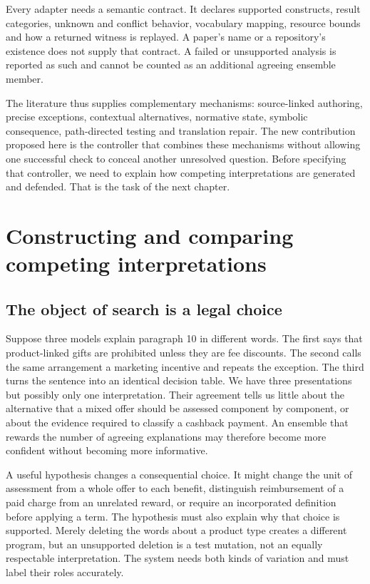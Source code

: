 \documentclass[12pt,a4paper,oneside,openany]{book}
\begin{document}
Every adapter needs a semantic contract. It declares supported constructs,
result categories, unknown and conflict behavior, vocabulary mapping,
resource bounds and how a returned witness is replayed. A paper's name or
a repository's existence does not supply that contract. A failed or
unsupported analysis is reported as such and cannot be counted as an
additional agreeing ensemble member.

The literature thus supplies complementary mechanisms: source-linked
authoring, precise exceptions, contextual alternatives, normative state,
symbolic consequence, path-directed testing and translation repair. The
new contribution proposed here is the controller that combines these
mechanisms without allowing one successful check to conceal another
unresolved question. Before specifying that controller, we need to explain
how competing interpretations are generated and defended. That is the task
of the next chapter.


\chapter{Constructing and comparing competing interpretations}
\label{ch:search}

\section{The object of search is a legal choice}
\label{merge:M05:00}


Suppose three models explain paragraph 10 in different words. The first says that
product-linked gifts are prohibited unless they are fee discounts. The second
calls the same arrangement a marketing incentive and repeats the exception. The
third turns the sentence into an identical decision table. We have three
presentations but possibly only one interpretation. Their agreement tells us
little about the alternative that a mixed offer should be assessed component by
component, or about the evidence required to classify a cashback payment. An
ensemble that rewards the number of agreeing explanations may therefore become
more confident without becoming more informative.

A useful hypothesis changes a consequential choice. It might change the unit of
assessment from a whole offer to each benefit, distinguish reimbursement of a
paid charge from an unrelated reward, or require an incorporated definition
before applying a term. The hypothesis must also explain why that choice is
supported. Merely deleting the words about a product type creates a different
program, but an unsupported deletion is a test mutation, not an equally
respectable interpretation. The system needs both kinds of variation and must
label their roles accurately.
\end{document}
